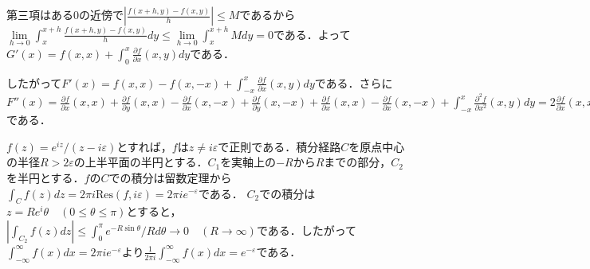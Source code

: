 \documentclass[
		book,
		head_space=20mm,
		foot_space=20mm,
		gutter=10mm,
		line_length=190mm
]{jlreq}
\begin{document}
第三項はある$0$の近傍で$\left|  \frac{f(x+h,y)-f(x,y)}{h}\right|\le M$であるから$\lim\limits_{h\to 0} \int_x^{x+h} \frac{f(x+h,y)-f(x,y)}{h}dy \le\lim\limits_{h\to 0}\int_x^{x+h} Mdy=0$である．よって$G'(x)=f(x,x)+\int_0^x \frac{\partial f}{\partial x}(x,y)dy$である．

したがって$F'(x)=f(x,x)-f(x,-x)+\int_{-x}^x \frac{\partial f}{\partial x}(x,y)dy$である．さらに$F''(x)=\frac{\partial f}{\partial x}(x,x)+\frac{\partial f}{\partial y}(x,x)-\frac{\partial f}{\partial x}(x,-x)+\frac{\partial f}{\partial y}(x,-x)+\frac{\partial f}{\partial x}(x,x)-\frac{\partial f}{\partial x}(x,-x)+\int_{-x}^x \frac{\partial^2 f}{\partial x^2}(x,y)dy=2\frac{\partial f}{\partial x}(x,x)-2\frac{\partial f}{\partial x}(x,-x)+\frac{\partial f}{\partial y}(x,x)+\frac{\partial f}{\partial y}(x,-x)+\int_{-x}^x \frac{\partial^2 f}{\partial x^2}(x,y)dy$である．

$f(z)=e^{iz}/(z-i\varepsilon)$とすれば，$f$は$z\neq i\varepsilon$で正則である．積分経路$C$を原点中心の半径$R>2\varepsilon$の上半平面の半円とする．$C_1$を実軸上の$-R$から$R$までの部分，$C_2$を半円とする．$f$の$C$での積分は留数定理から$\int_C f(z)dz=2\pi i \mathrm{Res}(f,i\varepsilon)=2\pi i e^{-\varepsilon}$である．
$C_2$での積分は$z=Re^i\theta \quad(0\le \theta\le \pi)$とすると，
$|\int_{C_2}f(z)dz|\le\int_{0}^{\pi}e^{-R\sin \theta}/Rd\theta\rightarrow 0\quad (R\to \infty)$である．したがって$\int_{-\infty}^{\infty}f(x)dx=2\pi i e^{-\varepsilon}$より$\frac{1}{2\pi i}\int_{-\infty}^{\infty}f(x)dx=e^{-\varepsilon}$である．
\end{document}
